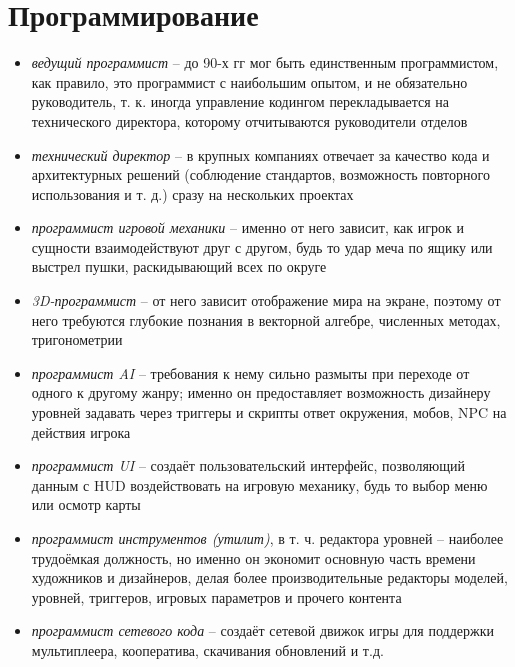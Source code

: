 \section{Программирование}
\begin{itemize}
    \item \emph{ведущий программист} -- до 90-х гг мог быть единственным программистом, как правило, это
        программист с наибольшим опытом, и не обязательно руководитель, т. к. иногда управление кодингом
        перекладывается на технического директора, которому отчитываются руководители отделов
    \item \emph{технический директор} -- в крупных компаниях отвечает за качество кода и архитектурных
        решений (соблюдение стандартов, возможность повторного использования и т. д.) сразу на нескольких
        проектах
    \item \emph{программист игровой механики} -- именно от него зависит, как игрок и сущности
        взаимодействуют друг с другом, будь то удар меча по ящику или выстрел пушки, раскидывающий всех по
        округе
    \item \emph{3D-программист} -- от него зависит отображение мира на экране, поэтому от него требуются
        глубокие познания в векторной алгебре, численных методах, тригонометрии
    \item \emph{программист AI} -- требования к нему сильно размыты при переходе от одного к другому
        жанру; именно он предоставляет возможность дизайнеру уровней задавать через триггеры и скрипты
        ответ окружения, мобов, NPC на действия игрока
    \item \emph{программист UI} -- создаёт пользовательский интерфейс, позволяющий данным с HUD
        воздействовать на игровую механику, будь то выбор меню или осмотр карты
    \item \emph{программист инструментов (утилит)}, в т. ч. редактора уровней -- наиболее трудоёмкая
        должность, но именно он экономит основную часть времени художников и дизайнеров, делая более
        производительные редакторы моделей, уровней, триггеров, игровых параметров и прочего контента
    \item \emph{программист сетевого кода} -- создаёт сетевой движок игры для поддержки мультиплеера,
        кооператива, скачивания обновлений и т.д.
\end{itemize}

